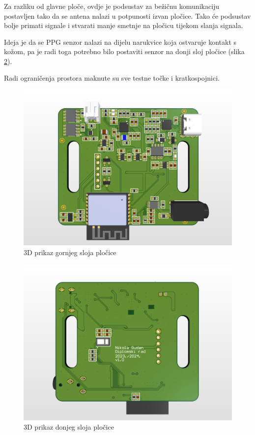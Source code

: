 Za razliku od glavne ploče, ovdje je podsustav za bežičnu komunikaciju postavljen tako da se antena nalazi u potpunosti izvan pločice. Tako će podsustav bolje primati signale i stvarati manje smetnje na pločicu tijekom slanja signala.

Ideja je da se PPG senzor nalazi na dijelu narukvice koja ostvaruje kontakt s kožom, pa je radi toga potrebno bilo postaviti senzor na donji sloj pločice (slika \ref{slk:BR_PCB_BOT}).

Radi ograničenja prostora maknute su sve testne točke i kratkospojnici.
\begin{figure}[htb]
    \centering
    \includegraphics[width=10 cm]{Figures/BR_PCB.png}
    \caption{3D prikaz gornjeg sloja pločice}
    \label{slk:BR_PCB_TOP}
\end{figure}
\begin{figure}[htb]
    \centering
    \includegraphics[width=10 cm]{Figures/BR_PCB_BOT.png}
    \caption{3D prikaz donjeg sloja pločice}
    \label{slk:BR_PCB_BOT}
\end{figure}